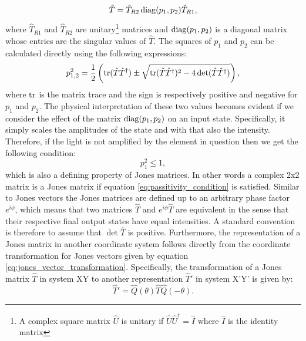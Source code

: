 \begin{equation}
    \label{eq:jones_singular_value_decomposition}
    \hat{T} = \hat{T}_{R2}\operatorname{diag}(p_1, p_2)\hat{T}_{R1},
\end{equation}
where $\hat{T}_{R1}$ and $\hat{T}_{R2}$ are unitary\footnote{A complex square matrix $\hat{U}$ is unitary if $\hat{U} \hat{U}^\dagger=\hat{I}$ where $\hat{I}$ is the identity matrix} matrices and $\operatorname{diag}(p_1, p_2)$ is a diagonal matrix whose entries are the singular values of $\hat{T}$. The squares of $p_1$ and $p_2$ can be calculated directly using the following expressions:
\begin{equation}
    p_{1,2}^2 = \frac{1}{2}\left(\operatorname{tr}(\hat{T}\hat{T}^{\dagger}) \pm 
    \sqrt{\operatorname{tr}(\hat{T}\hat{T}^{\dagger})^2-4\det(\hat{T}\hat{T}^{\dagger})}\right),
\end{equation}
where $\operatorname{tr}$ is the matrix trace and the sign is respectively positive and negative for $p_1$ and $p_2$. The physical interpretation of these two values becomes evident if we consider the effect of the matrix $\operatorname{diag}(p_1, p_2)$ on an input state. Specifically, it simply scales the amplitudes of the state and with that also the intensity. Therefore, if the light is not amplified by the element in question then we get the following condition:
\begin{equation}
    \label{eq:passitivity_condition}
    p_1^2 \leq 1,
\end{equation}
which is also a defining property of Jones matrices. In other words a complex 2x2 matrix is a Jones matrix if equation \ref{eq:passitivity_condition} is satisfied. Similar to Jones vectors the Jones matrices are defined up to an arbitrary phase factor $e^{i\phi}$, which means that two matrices $\hat{T}$ and $e^{i\phi}\hat{T}$ are equivalent in the sense that their respective final output states have equal intensities. A standard convention is therefore to assume that $\det \hat{T}$ is positive. Furthermore, the representation of a Jones matrix in another coordinate system follows directly from the coordinate transformation for Jones vectors given by equation \ref{eq:jones_vector_transformation}. Specifically, the transformation of a Jones matrix $\hat{T}$ in system XY to another representation $\hat{T}'$ in system X'Y' is given by:
\begin{equation}
    \label{eq:jones_matrix_transformation}
    \hat{T}' = \hat{Q}(\theta)\hat{T}\hat{Q}(-\theta).
\end{equation}
